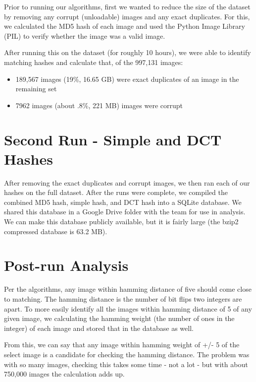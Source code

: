 \documentclass[11pt,a4paper,titlepage]{article}
\begin{document}
Prior to running our algorithms, first we wanted to reduce the size of the
dataset by removing any corrupt (unloadable) images and any exact duplicates.
For this, we calculated the MD5 hash of each image and used the Python Image
Library (PIL) to verify whether the image was a valid image.

After running this on the dataset (for roughly 10 hours), we were able to
identify matching hashes and calculate that, of the 997,131 images:

\begin{itemize}
    \item
        189,567 images (19\%, 16.65 GB)  were exact duplicates of an image in the remaining set
    \item
        7962 images (about .8\%, 221 MB) images were corrupt
\end{itemize}


\section{Second Run - Simple and DCT Hashes}

After removing the exact duplicates and corrupt images, we then ran each of our
hashes on the full dataset.  After the runs were complete, we compiled the
combined MD5 hash, simple hash, and DCT hash into a SQLite database.  We shared
this database in a Google Drive folder with the team for use in analysis.  We
can make this database publicly available, but it is fairly large (the bzip2
compressed database is 63.2 MB).

\section{Post-run Analysis}

Per the algorithms, any image within hamming distance of five should come close
to matching.  The hamming distance is the number of bit flips two integers are
apart.  To more easily identify all the images within hamming distance of 5 of
any given image, we calculating the hamming weight (the number of ones in the
integer) of each image and stored that in the database as well.

From this, we can say that any image within hamming weight of +/- 5 of the
select image is a candidate for checking the hamming distance.  The problem was
with so many images, checking this takes some time - not a lot - but with about
750,000 images the calculation adds up.
\end{document}
